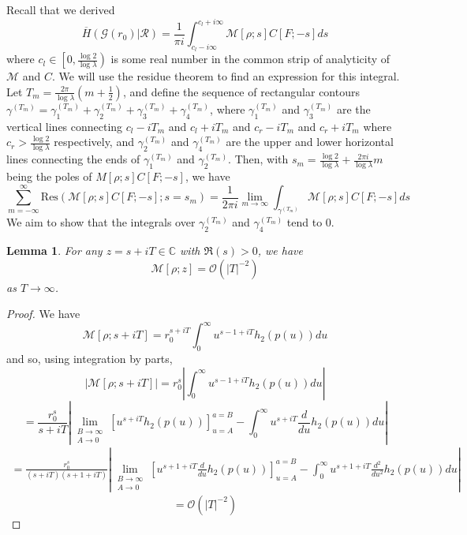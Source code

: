 \documentclass{article}
\newtheorem{lemma}{Lemma}
\newcommand{\tti}{\rightarrow\infty}
\newcommand{\graph}{\mathcal{G}}
\newcommand{\bigO}[1]{\mathcal{O}\left(#1\right)}
\newcommand{\ttz}[0]{\rightarrow 0}
\begin{document}
Recall that we derived
\begin{equation}
    \overline{H}(\graph(r_0)|\mathcal{R}) = \frac{1}{\pi i}\int_{c_l-i\infty}^{c_l+i\infty} \mathcal{M}[\rho;s]C[F;-s]ds
\end{equation}
where $c_l\in \left[0, \frac{\log 2}{\log \lambda}\right)$ is some real number in the common strip of analyticity of $\mathcal{M}$ and $C$. We will use the residue theorem to find an expression for this integral. Let $T_m = \frac{2\pi}{\log \lambda}\left(m+\frac{1}{2}\right)$, and define the sequence of rectangular contours $\gamma^{(T_m)} = \gamma^{(T_m)}_1 + \gamma^{(T_m)}_2 + \gamma^{(T_m)}_3 + \gamma_4^{(T_m)}$, where $\gamma_1^{(T_m)}$ and $\gamma_3^{(T_m)}$ are the vertical lines connecting $c_l-iT_m$ and $c_l+iT_m$ and $c_r-iT_m$ and $c_r+iT_m$ where $c_r > \frac{\log 2}{\log \lambda}$ respectively, and $\gamma_2^{(T_m)}$ and $\gamma_4^{(T_m)}$ are the upper and lower horizontal lines connecting the ends of $\gamma_1^{(T_m)}$ and $\gamma_2^{(T_m)}$. Then, with $s_m = \frac{\log 2}{\log \lambda} + \frac{2\pi i}{\log \lambda}m$ being the poles of $M[\rho;s]C[F;-s]$, we have
\begin{equation}
    \sum_{m=-\infty}^{\infty} \text{Res}(\mathcal{M}[\rho;s]C[F;-s]; s=s_m) = \frac{1}{2\pi i}\lim_{m\tti}\int_{\gamma^{(T_m)}} \mathcal{M}[\rho;s]C[F;-s]ds
\end{equation}
We aim to show that the integrals over $\gamma_2^{(T_m)}$ and $\gamma_4^{(T_m)}$ tend to 0. 
\begin{lemma}
    \label{thm:decay}
    For any $z = s+iT \in \mathbb{C}$ with $\Re(s) > 0$, we have
    \begin{equation}
        \mathcal{M}[\rho; z] = \bigO{|T|^{-2}}
    \end{equation}
    as $T\tti$.
\end{lemma}
\begin{proof}
    We have
    \begin{equation}
        \mathcal{M}[\rho; s+iT] = r_0^{s+iT}\int_0^{\infty}u^{s-1+iT}h_2(p(u))du
    \end{equation}
    and so, using integration by parts,
    \begin{equation}
        |\mathcal{M}[\rho; s+iT]| = r_0^s\left|\int_0^{\infty}u^{s-1+iT}h_2(p(u))du\right|
    \end{equation}
    \begin{equation}
        = \frac{r_0^s}{s+iT}\left|\lim_{\substack{B\tti \\ A\ttz}}\left[u^{s+iT}h_2(p(u))\right]_{u=A}^{a=B} - \int_0^\infty u^{s+iT}\frac{d}{du}h_2(p(u))du\right|
    \end{equation}
    \begin{align}
        = \frac{r_0^s}{(s+iT)(s+1+iT)}\left|\lim_{\substack{B\tti \\ A\ttz}}\left[u^{s+1+iT}\frac{d}{du}h_2(p(u))\right]_{u=A}^{a=B} - \int_0^\infty u^{s+1+iT}\frac{d^2}{du^2}h_2(p(u))du\right|
    \end{align}
    \begin{equation}
        = \bigO{|T|^{-2}}
    \end{equation}
\end{proof}
\end{document}
